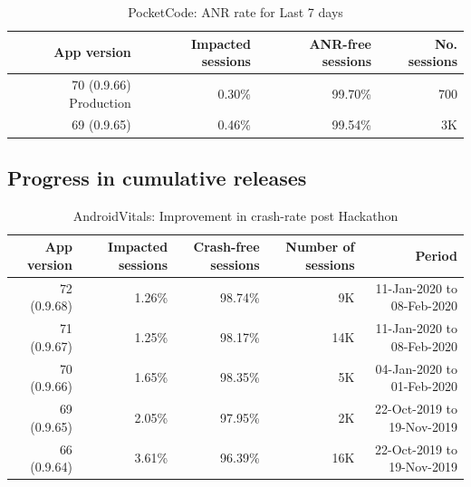 \begin{table}[htbp!]
    \centering
    \footnotesize
    \begin{tabular}{r|r|r|r}
      App version  &Impacted sessions &ANR-free sessions &No. sessions \\
      \hline
      70 (0.9.66) Production &0.30\% &99.70\%	&~700 \\
      69 (0.9.65)            &0.46\% &99.54\%	&~3K  \\
    \end{tabular}
    \caption{PocketCode: ANR rate for Last 7 days}
    \label{tab:ANR_rate_24_to_29_Nov_2019}
\end{table}

\subsection{Progress in cumulative releases}


\begin{table}[htbp!]
    \centering
    \footnotesize
    \tabcolsep=0.06cm
    \begin{tabular}{r|r|r|r|r}
    \small
        App version &Impacted sessions &Crash-free sessions &Number of sessions &Period \\
        \hline
        72 (0.9.68) &1.26\% &   98.74\%     &~9K  &11-Jan-2020 to 08-Feb-2020 \\
        71 (0.9.67) &1.25\% &   98.17\%     &~14K &11-Jan-2020 to 08-Feb-2020 \\
        70 (0.9.66) &1.65\% &   98.35\%     &~5K  &04-Jan-2020 to 01-Feb-2020 \\
        69 (0.9.65) &2.05\% &	97.95\% 	&~2K  &22-Oct-2019 to 19-Nov-2019 \\
        \hline
        66 (0.9.64) &3.61\% &   96.39\% 	&~16K &22-Oct-2019 to 19-Nov-2019 \\
    \end{tabular}
    \caption{AndroidVitals: Improvement in crash-rate post Hackathon}
    \label{tab:androidvitals_crashrate_post_hackathon}
\end{table}

